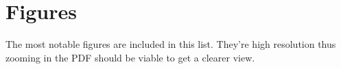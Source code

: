 \chapter*{Figures}

The most notable figures are included in this list. They're high resolution thus zooming in the PDF should be viable to get a clearer view.



